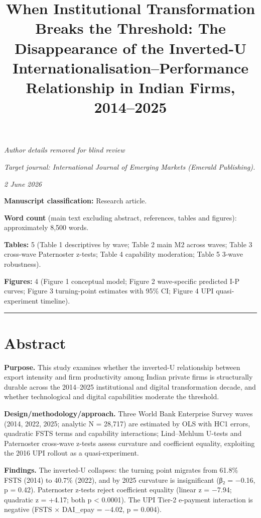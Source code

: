 \documentclass[
  12pt]{article}
\title{When Institutional Transformation Breaks the Threshold: The
Disappearance of the Inverted-U Internationalisation--Performance
Relationship in Indian Firms, 2014--2025}
\author{}
\date{}
\begin{document}
\maketitle

\emph{Author details removed for blind review}

\emph{Target journal: International Journal of Emerging Markets (Emerald
Publishing).}

\emph{2 June 2026}

\textbf{Manuscript classification:} Research article.

\textbf{Word count} (main text excluding abstract, references, tables
and figures): approximately 8,500 words.

\textbf{Tables:} 5 (Table 1 descriptives by wave; Table 2 main M2 across
waves; Table 3 cross-wave Paternoster z-tests; Table 4 capability
moderation; Table 5 3-wave robustness).

\textbf{Figures:} 4 (Figure 1 conceptual model; Figure 2 wave-specific
predicted I-P curves; Figure 3 turning-point estimates with 95\% CI;
Figure 4 UPI quasi-experiment timeline).

\begin{center}\rule{0.5\linewidth}{0.5pt}\end{center}

\hypertarget{abstract}{%
\section{Abstract}\label{abstract}}

\textbf{Purpose.} This study examines whether the inverted-U
relationship between export intensity and firm productivity among Indian
private firms is structurally durable across the 2014--2025
institutional and digital transformation decade, and whether
technological and digital capabilities moderate the threshold.

\textbf{Design/methodology/approach.} Three World Bank Enterprise Survey
waves (2014, 2022, 2025; analytic N = 28,717) are estimated by OLS with
HC1 errors, quadratic FSTS terms and capability interactions;
Lind--Mehlum U-tests and Paternoster cross-wave z-tests assess curvature
and coefficient equality, exploiting the 2016 UPI rollout as a
quasi-experiment.

\textbf{Findings.} The inverted-U collapses: the turning point migrates
from 61.8\% FSTS (2014) to 40.7\% (2022), and by 2025 curvature is
insignificant (β₂ = −0.16, p = 0.42). Paternoster z-tests reject
coefficient equality (linear z = −7.94; quadratic z = +4.17; both p
\textless{} 0.0001). The UPI Tier-2 e-payment interaction is negative
(FSTS × DAI\_epay = −4.02, p = 0.004).
\end{document}
